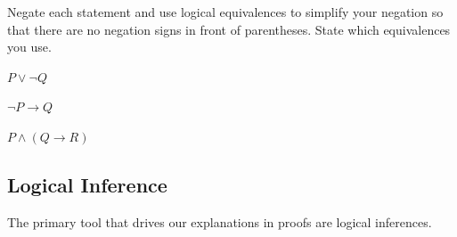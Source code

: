 \begin{act}
\label{act_simplify_complicated_statements}
    Negate each statement and use logical equivalences to simplify your negation so that there are no negation signs in front of parentheses. State which equivalences you use.
        \begin{actpart}
            \item $P \lor \neg Q$
            \item $\neg P \to Q$
            \item $P \land (Q \to R)$
        \end{actpart}
\end{act}

\newcommand{\subinference}{Logical Inference}
\subsection{\subinference}
\label{sub_proof_inf}

The primary tool that drives our explanations in proofs are logical inferences.

